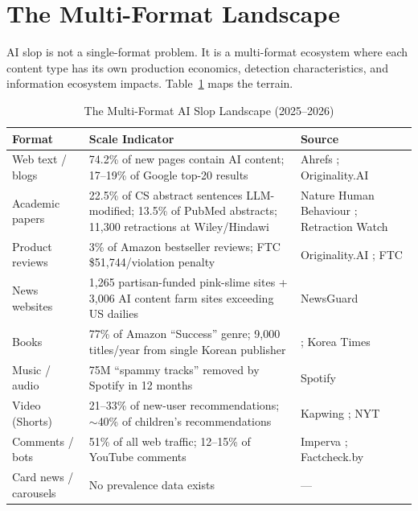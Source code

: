 \documentclass[12pt]{article}
\begin{document}
\section{The Multi-Format Landscape}

AI slop is not a single-format problem. It is a multi-format ecosystem where each content type has its own production economics, detection characteristics, and information ecosystem impacts. Table~\ref{tab:landscape} maps the terrain.

\begin{table}[ht]
\centering
\caption{The Multi-Format AI Slop Landscape (2025--2026)}
\label{tab:landscape}
\small
\begin{tabular}{@{}p{3.2cm}p{6.5cm}p{4.5cm}@{}}
\toprule
\textbf{Format} & \textbf{Scale Indicator} & \textbf{Source} \\
\midrule
Web text / blogs & 74.2\% of new pages contain AI content; 17--19\% of Google top-20 results & Ahrefs \cite{ahrefs2025}; Originality.AI \cite{originality2025google} \\
\addlinespace
Academic papers & 22.5\% of CS abstract sentences LLM-modified; 13.5\% of PubMed abstracts; 11,300 retractions at Wiley/Hindawi & Nature Human Behaviour \cite{liang2025nature}; Retraction Watch \cite{retraction2024} \\
\addlinespace
Product reviews & 3\% of Amazon bestseller reviews; FTC \$51,744/violation penalty & Originality.AI \cite{originality2025amazon}; FTC \cite{ftc2024} \\
\addlinespace
News websites & 1,265 partisan-funded pink-slime sites + 3,006 AI content farm sites exceeding US dailies & NewsGuard \cite{newsguard2025} \\
\addlinespace
Books & 77\% of Amazon ``Success'' genre; 9,000 titles/year from single Korean publisher & \cite{amazon2025books}; Korea Times \cite{koreatimes2025} \\
\addlinespace
Music / audio & 75M ``spammy tracks'' removed by Spotify in 12 months & Spotify \cite{spotify2025} \\
\addlinespace
Video (Shorts) & 21--33\% of new-user recommendations; ${\sim}$40\% of children's recommendations & Kapwing \cite{kapwing2025}; NYT \cite{nyt2026children} \\
\addlinespace
Comments / bots & 51\% of all web traffic; 12--15\% of YouTube comments & Imperva \cite{imperva2025}; Factcheck.by \cite{factcheck2025} \\
\addlinespace
Card news / carousels & No prevalence data exists & --- \\
\bottomrule
\end{tabular}
\end{table}
\end{document}
